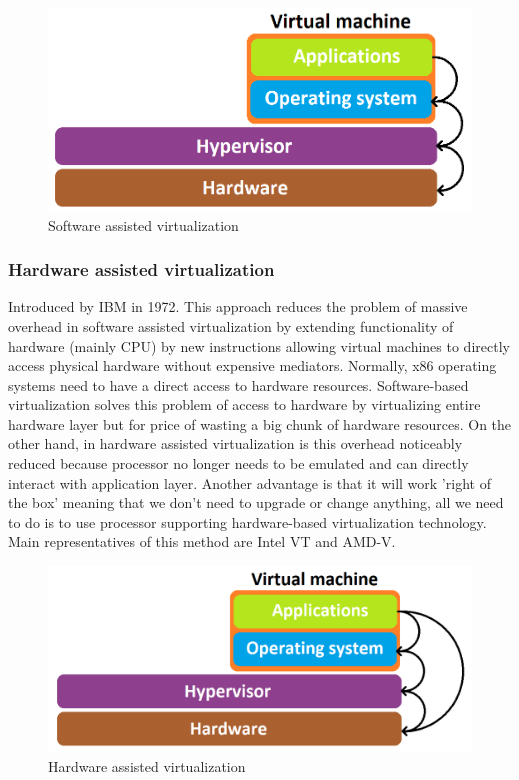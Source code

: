 \begin{figure}[H]
\centering
\includegraphics[scale=0.4]{sw-assist.png}
\caption{Software assisted virtualization}
\end{figure}

\subsubsection{Hardware assisted virtualization}
Introduced by IBM in 1972. This approach reduces the problem of massive overhead in software assisted virtualization by extending functionality of hardware (mainly CPU) by new instructions allowing virtual machines to directly access physical hardware without expensive mediators. Normally, x86 operating systems need to have a direct access to hardware resources. Software-based virtualization solves this problem of access to hardware by virtualizing entire hardware layer but for price of wasting a big chunk of hardware resources. On the other hand, in hardware assisted virtualization is this overhead noticeably reduced because processor no longer needs to be emulated and can directly interact with application layer. Another advantage is that it will work 'right of the box' meaning that we don't need to upgrade or change anything, all we need to do is to use processor supporting hardware-based virtualization technology. Main representatives of this method are Intel VT and AMD-V.

\begin{figure}[H]
\centering
\includegraphics[scale=0.4]{hw-assist.png}
\caption{Hardware assisted virtualization}
\end{figure}

